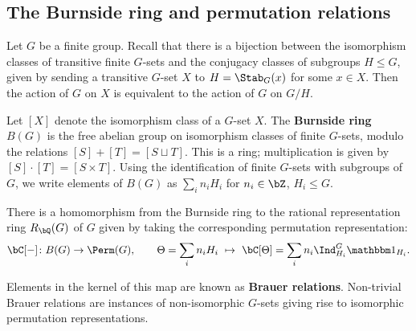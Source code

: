 
\subsection{The Burnside ring and \color{red} permutation relations}

Let $G$ be a finite group. Recall that there is a bijection between the isomorphism classes of transitive finite $G$-sets and the conjugacy classes of subgroups $H \leq G$, given by sending a transitive $G$-set $X$ to $H = \Stab_{G}(x)$ for some $x \in X$. Then the action of $G$ on $X$ is equivalent to the action of $G$ on $G / H$. 

\begin{defn}
Let $[X]$ denote the isomorphism class of a $G$-set $X$. 
The \textbf{Burnside ring} $B(G)$ is the free abelian group on isomorphism classes of finite $G$-sets, modulo the relations  $[S] + [T] = [S \sqcup T]$. This is a ring; multiplication is given by $[S] \cdot [T] = [S \times T]$. Using the identification of finite $G$-sets with subgroups of $G$, we write elements of $B(G)$ as $\sum_i n_i H_i$ for $n_i \in \bZ$, $H_i \leq G$. 
\end{defn}

\begin{notn}
There is a homomorphism from the Burnside ring to the rational representation ring $R_{\bQ}(G)$ of $G$ given by taking the corresponding permutation representation:
\[ \bC[-] \colon B(G) \to \Perm(G),  \qquad \Theta = \sum_i n_i H_i \ \mapsto \ \bC[\Theta ] = \sum_i n_i \Ind_{H_i}^G \trivial_{H_i}. \]
\end{notn}
Elements in the kernel of this map are known as \textbf{Brauer relations}. Non-trivial Brauer relations are instances of non-isomorphic $G$-sets giving rise to isomorphic permutation representations. 

